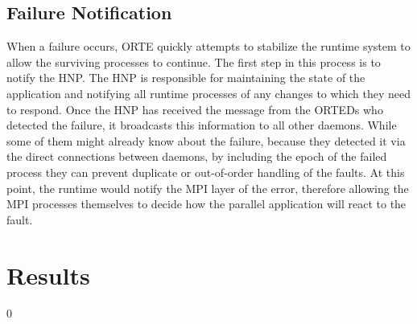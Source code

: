 \documentclass{llncs}
\begin{document}
\subsection{Failure Notification}
When a failure occurs, ORTE quickly attempts to stabilize the runtime
system to allow the surviving processes to continue. The first step in
this process is to notify the HNP. The HNP is responsible for
maintaining the state of the application and notifying all runtime
processes of any changes to which they need to respond. Once the HNP
has received the message from the ORTEDs who detected
the failure, it broadcasts this information to all other daemons.
While some of them might already know about the failure, because they
detected it via the direct connections between daemons, by including
the epoch of the failed process they can prevent duplicate or
out-of-order handling of the faults. At this point, the runtime would
notify the MPI layer of the error, therefore allowing the MPI
processes themselves to decide how the parallel application will
react to the fault.


\section{Results}
\label{sect:results}


0
\end{document}
